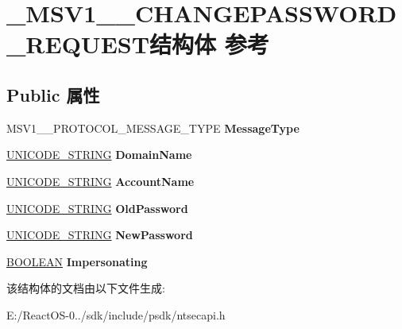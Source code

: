 \hypertarget{struct___m_s_v1__0___c_h_a_n_g_e_p_a_s_s_w_o_r_d___r_e_q_u_e_s_t}{}\section{\+\_\+\+M\+S\+V1\+\_\+\_\+\+C\+H\+A\+N\+G\+E\+P\+A\+S\+S\+W\+O\+R\+D\+\_\+\+R\+E\+Q\+U\+E\+S\+T结构体 参考}
\label{struct___m_s_v1__0___c_h_a_n_g_e_p_a_s_s_w_o_r_d___r_e_q_u_e_s_t}
\subsection*{Public 属性}
\begin{DoxyCompactItemize}
\item 
\mbox{\label{struct___m_s_v1__0___c_h_a_n_g_e_p_a_s_s_w_o_r_d___r_e_q_u_e_s_t_a15a1ea97373f29ded7d0725139352cb6}} 
M\+S\+V1\+\_\+\_\+\+P\+R\+O\+T\+O\+C\+O\+L\+\_\+\+M\+E\+S\+S\+A\+G\+E\+\_\+\+T\+Y\+PE {\bfseries Message\+Type}
\item 
\mbox{\label{struct___m_s_v1__0___c_h_a_n_g_e_p_a_s_s_w_o_r_d___r_e_q_u_e_s_t_ae8e08bdc61e7b1f4d19cf5cfc2a96387}} 
\hyperlink{struct___u_n_i_c_o_d_e___s_t_r_i_n_g}{U\+N\+I\+C\+O\+D\+E\+\_\+\+S\+T\+R\+I\+NG} {\bfseries Domain\+Name}
\item 
\mbox{\label{struct___m_s_v1__0___c_h_a_n_g_e_p_a_s_s_w_o_r_d___r_e_q_u_e_s_t_a9aca1c4aaf21ae8adfd801f75faae3b5}} 
\hyperlink{struct___u_n_i_c_o_d_e___s_t_r_i_n_g}{U\+N\+I\+C\+O\+D\+E\+\_\+\+S\+T\+R\+I\+NG} {\bfseries Account\+Name}
\item 
\mbox{\label{struct___m_s_v1__0___c_h_a_n_g_e_p_a_s_s_w_o_r_d___r_e_q_u_e_s_t_acff87aa582b033e75c78f2ccab0f239b}} 
\hyperlink{struct___u_n_i_c_o_d_e___s_t_r_i_n_g}{U\+N\+I\+C\+O\+D\+E\+\_\+\+S\+T\+R\+I\+NG} {\bfseries Old\+Password}
\item 
\mbox{\label{struct___m_s_v1__0___c_h_a_n_g_e_p_a_s_s_w_o_r_d___r_e_q_u_e_s_t_aa62ae2a2d90cb7009ffe38afaeb134bc}} 
\hyperlink{struct___u_n_i_c_o_d_e___s_t_r_i_n_g}{U\+N\+I\+C\+O\+D\+E\+\_\+\+S\+T\+R\+I\+NG} {\bfseries New\+Password}
\item 
\mbox{\label{struct___m_s_v1__0___c_h_a_n_g_e_p_a_s_s_w_o_r_d___r_e_q_u_e_s_t_a1f5316d0bbccf797860424b45b4cec3d}} 
\hyperlink{_processor_bind_8h_a112e3146cb38b6ee95e64d85842e380a}{B\+O\+O\+L\+E\+AN} {\bfseries Impersonating}
\end{DoxyCompactItemize}


该结构体的文档由以下文件生成\+:\begin{DoxyCompactItemize}
\item 
E\+:/\+React\+O\+S-\/0../sdk/include/psdk/ntsecapi.\+h\end{DoxyCompactItemize}
